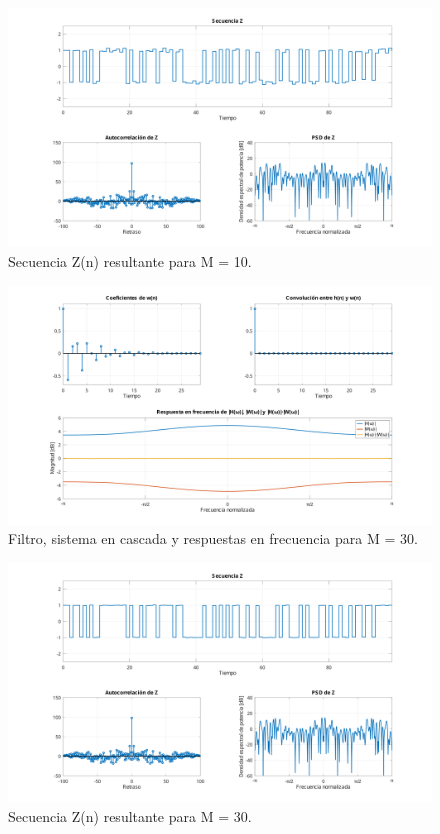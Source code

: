 \begin{figure}[!hbp]
	\centering
	\includegraphics[width=1\linewidth,trim=4cm 0 4cm 0,clip]{img/ej4_10_z.pdf}
	\caption{Secuencia Z(n) resultante para M = 10.}
	\label{fig:ej4_10_z}
\end{figure}

\begin{figure}[!hbp]
	\centering
	\includegraphics[width=1\linewidth,trim=4cm 0 4cm 0,clip]{img/ej4_30_coef.pdf}
	\caption{Filtro, sistema en cascada y respuestas en frecuencia para M = 30.}
	\label{fig:ej4_30_coef}
\end{figure}

\begin{figure}[!hbp]
	\centering
	\includegraphics[width=1\linewidth,trim=4cm 0 4cm 0,clip]{img/ej4_30_z.pdf}
	\caption{Secuencia Z(n) resultante para M = 30.}
	\label{fig:ej4_30_z}
\end{figure}

